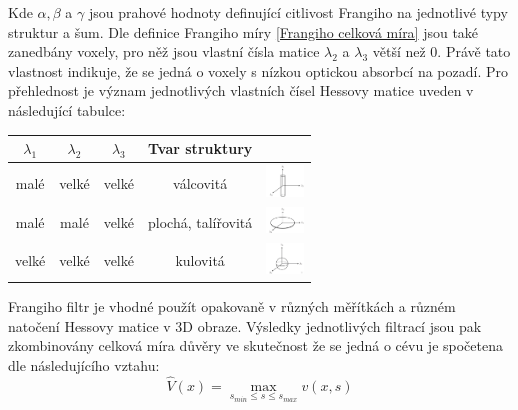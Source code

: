 \documentclass{thesis}%
\begin{document}
Kde $\alpha,\beta$ a $\gamma$ jsou prahové hodnoty definující citlivost Frangiho na jednotlivé typy struktur a šum. Dle definice Frangiho míry  \ref{Frangiho celková míra} jsou také zanedbány voxely, pro něž jsou vlastní čísla matice $\lambda_2$ a $\lambda_3$ větší než 0. Právě tato vlastnost indikuje, že se jedná o voxely s nízkou optickou absorbcí na pozadí. Pro přehlednost je význam jednotlivých vlastních čísel Hessovy matice uveden v následující tabulce:
\begin{center} 
\begin{tabular}{c c c c c}
\hline
$\lambda_1$ & $\lambda_2$  & $\lambda_3$ & Tvar struktury& \\
\hline
malé & velké  & velké & válcovitá &\includegraphics[width=1.0cm]{imgs/tube.png} \\
\hline
malé & malé  & velké & plochá, talířovitá &\includegraphics[width=1.0cm]{imgs/plate.png} \\
\hline
velké & velké  & velké & kulovitá &\includegraphics[width=1.0cm]{imgs/blob.png} \\
\end{tabular}
\end{center}
Frangiho filtr je vhodné použít opakovaně v různých měřítkách a různém natočení Hessovy matice v 3D obraze. Výsledky jednotlivých filtrací jsou pak zkombinovány celková míra důvěry ve skutečnost že se jedná o cévu je spočetena dle následujícího vztahu:
 \begin{equation}
\hat{V}(x) = \max_{s_{min}\leq s\leq s_{max}} v(x,s)
\end{equation}
\end{document}
